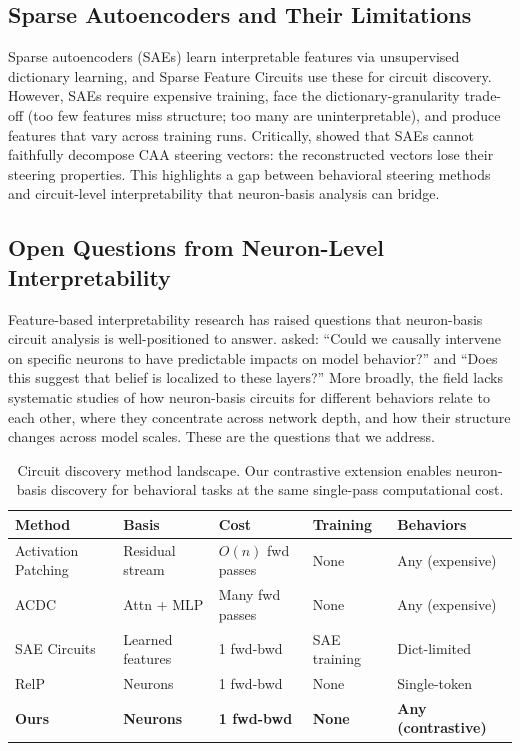 \documentclass[11pt]{article}
\begin{document}
\subsection{Sparse Autoencoders and Their Limitations}
\label{sec:bg_sae}

Sparse autoencoders (SAEs) \citep{cunningham2023sae, bricken2023monosemanticity, templeton2024scaling} learn interpretable features via unsupervised dictionary learning, and Sparse Feature Circuits \citep{marks2024sparse} use these for circuit discovery.
However, SAEs require expensive training, face the dictionary-granularity trade-off (too few features miss structure; too many are uninterpretable), and produce features that vary across training runs.
Critically, \citet{mayne2024sae_steering} showed that SAEs cannot faithfully decompose CAA steering vectors: the reconstructed vectors lose their steering properties.
This highlights a gap between behavioral steering methods and circuit-level interpretability that neuron-basis analysis can bridge.

\subsection{Open Questions from Neuron-Level Interpretability}
\label{sec:bg_open}

Feature-based interpretability research has raised questions that neuron-basis circuit analysis is well-positioned to answer.
\citet{chalnick2025goodfire} asked: ``Could we causally intervene on specific neurons to have predictable impacts on model behavior?'' and ``Does this suggest that belief is localized to these layers?''
More broadly, the field lacks systematic studies of how neuron-basis circuits for different behaviors relate to each other, where they concentrate across network depth, and how their structure changes across model scales.
These are the questions that we address.

\begin{table}[t]
\centering
\caption{Circuit discovery method landscape. Our contrastive extension enables neuron-basis discovery for behavioral tasks at the same single-pass computational cost.}
\label{tab:landscape}
\small
\begin{tabular}{lllll}
\toprule
\textbf{Method} & \textbf{Basis} & \textbf{Cost} & \textbf{Training} & \textbf{Behaviors} \\
\midrule
Activation Patching & Residual stream & $O(n)$ fwd passes & None & Any (expensive) \\
ACDC \citep{conmy2023acdc} & Attn + MLP & Many fwd passes & None & Any (expensive) \\
SAE Circuits \citep{marks2024sparse} & Learned features & 1 fwd-bwd & SAE training & Dict-limited \\
RelP \citep{arora2025circuits} & Neurons & 1 fwd-bwd & None & Single-token \\
\textbf{Ours} & \textbf{Neurons} & \textbf{1 fwd-bwd} & \textbf{None} & \textbf{Any (contrastive)} \\
\bottomrule
\end{tabular}
\end{table}
\end{document}
